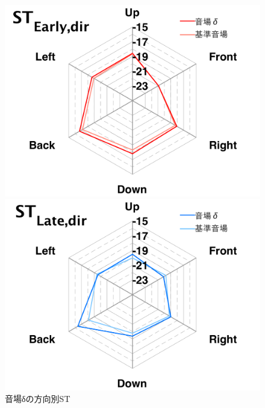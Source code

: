 \documentclass[11pt,a4j]{jreport}
\begin{document}
\begin{figure}[H]
  \begin{minipage}[b]{.5\linewidth}
      \centering
      \includegraphics[width=1\linewidth]{images/experimentField/withLegend/04deltaOnBaseEarly.pdf}
  \end{minipage}%
  \begin{minipage}[b]{.5\linewidth}
      \centering
      \includegraphics[width=1\linewidth]{images/experimentField/withLegend/08deltaOnBaseLate.pdf}
  \end{minipage}
  \caption{音場δの方向別ST}
  \label{fig:音場δの方向別ST}
\end{figure}
\end{document}
